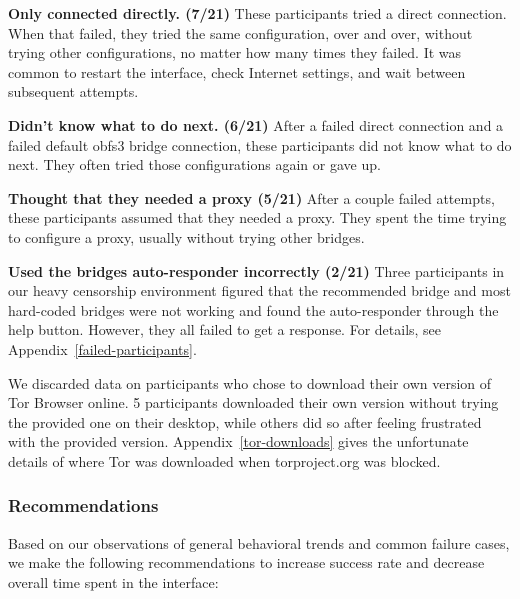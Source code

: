 \documentclass[USenglish,oneside,twocolumn]{article}
\begin{document}
\begin{description}
\item {\bfseries Only connected directly. (7/21)} These participants tried a direct connection. When that failed, they tried the same configuration, over and over, without trying other configurations, no matter how many times they failed. It was common to restart the interface, check Internet settings, and wait between subsequent attempts. 
\item {\bfseries Didn't know what to do next. (6/21)} After a failed direct connection and a failed default obfs3 bridge connection, these participants did not know what to do next. They often tried those configurations again or gave up. 
\item {\bfseries Thought that they needed a proxy (5/21)} After a couple failed attempts, these participants assumed that they needed a proxy. They spent the time trying to configure a proxy, usually without trying other bridges. 
\item {\bfseries Used the bridges auto-responder incorrectly (2/21)} Three participants in our heavy censorship environment figured that the recommended bridge and most hard-coded bridges were not working and found the auto-responder through the help button. However, they all failed to get a response. For details, see Appendix~\ref{failed-participants}.
\end{description} 

We discarded data on participants who chose to download their own version of Tor Browser online. 5 participants downloaded their own version without trying the provided one on their desktop, while others did so after feeling frustrated with the provided version. Appendix~\ref{tor-downloads} gives the unfortunate details of where Tor was downloaded when torproject.org was blocked.

\subsubsection{Recommendations}
\label{recommendations}
Based on our observations of general behavioral trends and common failure cases, we make the following recommendations to increase success rate and decrease overall time spent in the interface: \\
\end{document}
